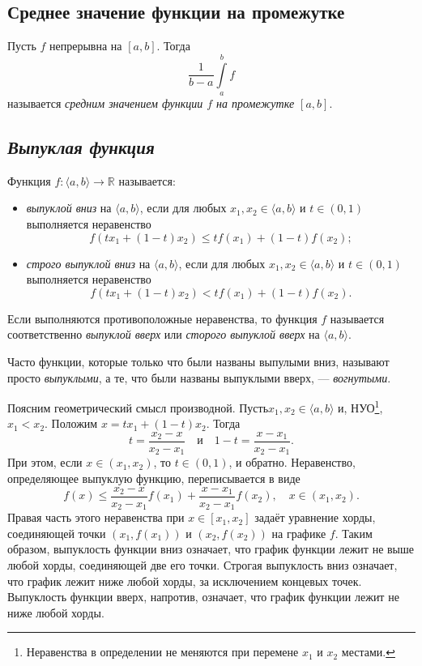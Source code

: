 \subsection{Среднее значение функции на промежутке}

\hypertarget{average}{}
\begin{definition}
	Пусть $f$ непрерывна на $[a, b]$. Тогда \[
		\dfrac1{b - a}\int\limits_a^b f
	\]
	называется \textit{средним значением функции $f$ на промежутке $[a, b]$}.
\end{definition}

\subsection{\itshape Выпуклая функция}

\begin{definition}
	Функция \(f \colon \langle a, b \rangle \to \mathbb{R}\) называется:
	\begin{itemize}
		\item \textit{выпуклой вниз} на \(\langle a, b \rangle\), если для любых \(x_1, x_2 \in \langle a, b \rangle\) и \(t \in (0, 1)\) выполняется неравенство \[
		f(t x_1 + (1 - t) x_2) \le t f(x_1) + (1 - t) f(x_2);
		\]
		\item \textit{строго выпуклой вниз} на \(\langle a, b \rangle\), если для любых \(x_1, x_2 \in \langle a, b \rangle\) и \(t \in (0, 1)\) выполняется неравенство \[
		f(t x_1 + (1 - t) x_2) < t f(x_1) + (1 - t) f(x_2).
		\]
	\end{itemize}
	
	Если выполняются противоположные неравенства, то функция \(f\) называется соответственно \textit{выпуклой вверх} или \textit{сторого выпуклой вверх} на \(\langle a, b \rangle\).
	
	Часто функции, которые только что были названы выпулыми вниз, называют просто \textit{выпуклыми}, а те, что были названы выпуклыми вверх, --- \textit{вогнутыми}.
	
	Поясним геометрический смысл производной. Пусть\(x_1, x_2 \in \langle a, b \rangle\) и, НУО\footnote{Неравенства в определении не меняются при перемене \(x_1\) и \(x_2\) местами.}, \(x_1 < x_2\). Положим \(x = t x_1 + (1 - t) x_2\). Тогда \[
		t = \frac{x_2 - x}{x_2 - x_1} \quad \text{и} \quad 1 - t = \frac{x - x_1}{x_2 - x_1}.
	\]
	При этом, если \(x \in (x_1, x_2)\), то \(t \in (0, 1)\), и обратно. Неравенство, определяющее выпуклую функцию, переписывается в виде \[
		f(x) \le \frac{x_2 - x}{x_2 - x_1} f(x_1) + \frac{x - x_1}{x_2 - x_1} f(x_2), \quad x \in (x_1, x_2).
	\]
	Правая часть этого неравенства при \(x \in [x_1, x_2]\) задаёт уравнение хорды, соединяющей точки \((x_1, f(x_1))\) и \((x_2, f(x_2))\) на графике \(f\). Таким образом, выпуклость функции вниз означает, что график функции лежит не выше любой хорды, соединяющей две его точки. Строгая выпуклость вниз означает, что график лежит ниже любой хорды, за исключением концевых точек. Выпуклость функции вверх, напротив, означает, что график функции лежит не ниже любой хорды.
\end{definition}

